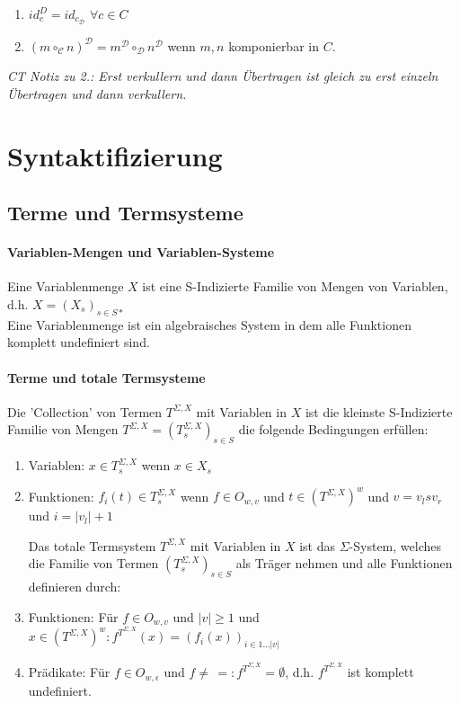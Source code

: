 \begin{enumerate}
\item $id_c^D = id_{c_\mathcal{D}}$ $\forall c \in C$
\item $(m \circ_\mathcal{C} n)^\mathcal{D} = m^\mathcal{D} \circ_\mathcal{D} n^\mathcal{D}$  wenn $m,n$ komponierbar in $C$.
\end{enumerate}
\emph{CT Notiz zu 2.: Erst verkullern und dann Übertragen ist gleich zu erst einzeln Übertragen und dann verkullern.}


\section{Syntaktifizierung}

\subsection{Terme und Termsysteme}

\paragraph{ Variablen-Mengen und Variablen-Systeme}  
Eine Variablenmenge $X$ ist eine S-Indizierte Familie von Mengen von Variablen, d.h. $X = (X_s)_{s \in S*}$ \\
Eine Variablenmenge ist ein algebraisches System in dem alle Funktionen komplett undefiniert sind.

\paragraph{ Terme und totale Termsysteme}
Die 'Collection' von Termen $T^{\Sigma,X}$ mit Variablen in $X$ ist die kleinste S-Indizierte Familie von Mengen $T^{\Sigma, X} = (T^{\Sigma, X}_s)_{s \in S}$ die folgende Bedingungen erfüllen:
\begin{enumerate}
\item Variablen: $x \in T^{\Sigma, X}_s $ wenn $x \in X_s$
\item Funktionen: $f_i(t) \in T^{\Sigma, X}_s $ wenn $f \in O_{w,v} $ und $t \in (T^{\Sigma, X})^w $ und $v = v_l sv_r$ und $i = |v_l| +1$

Das totale Termsystem $T^{\Sigma, X}$ mit Variablen in $X$ ist das $\Sigma$-System, welches die Familie von Termen $(T^{\Sigma, X}_s)_{s \in S}$ als Träger nehmen und alle Funktionen definieren durch:

\item Funktionen: Für $f \in O_{w,v} $ und $|v| \geq 1$ und $x \in (T^{\Sigma, X})^w: f^{T^{\Sigma, X}}(x) = (f_i(x))_{i \in 1 \dots |v|}$
\item Prädikate: Für $f \in O_{w, \epsilon}$ und $f \neq \, =: f^{T^{\Sigma, X}} = \emptyset$, d.h. $f^{T^{\Sigma, X}}$ ist komplett undefiniert. 
\end{enumerate}

